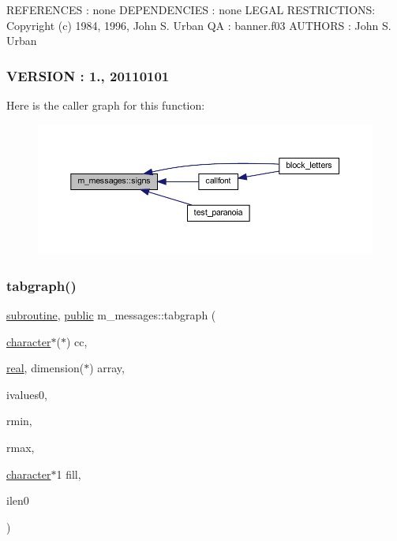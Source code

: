R\+E\+F\+E\+R\+E\+N\+C\+ES \+: none D\+E\+P\+E\+N\+D\+E\+N\+C\+I\+ES \+: none L\+E\+G\+AL R\+E\+S\+T\+R\+I\+C\+T\+I\+O\+NS\+: Copyright (c) 1984, 1996, John S. Urban QA \+: banner.\+f03 A\+U\+T\+H\+O\+RS \+: John S. Urban \subsubsection*{V\+E\+R\+S\+I\+ON \+: 1., 20110101}Here is the caller graph for this function\+:
\nopagebreak
\begin{figure}[H]
\begin{center}
\leavevmode
\includegraphics[width=350pt]{namespacem__messages_a239cb1269cc27d45176b9a278276d399_icgraph}
\end{center}
\end{figure}
\mbox{\label{namespacem__messages_acc516fb8a4dd9eede3abb535ff7496e0}} 
\subsubsection{\texorpdfstring{tabgraph()}{tabgraph()}}
{\footnotesize\ttfamily \hyperlink{M__stopwatch_83_8txt_acfbcff50169d691ff02d4a123ed70482}{subroutine}, \hyperlink{M__stopwatch_83_8txt_a2f74811300c361e53b430611a7d1769f}{public} m\+\_\+messages\+::tabgraph (\begin{DoxyParamCaption}\item[{\hyperlink{option__stopwatch_83_8txt_abd4b21fbbd175834027b5224bfe97e66}{character}$\ast$($\ast$)}]{cc,  }\item[{\hyperlink{read__watch_83_8txt_abdb62bde002f38ef75f810d3a905a823}{real}, dimension($\ast$)}]{array,  }\item[{}]{ivalues0,  }\item[{}]{rmin,  }\item[{}]{rmax,  }\item[{\hyperlink{option__stopwatch_83_8txt_abd4b21fbbd175834027b5224bfe97e66}{character}$\ast$1}]{fill,  }\item[{}]{ilen0 }\end{DoxyParamCaption})}



